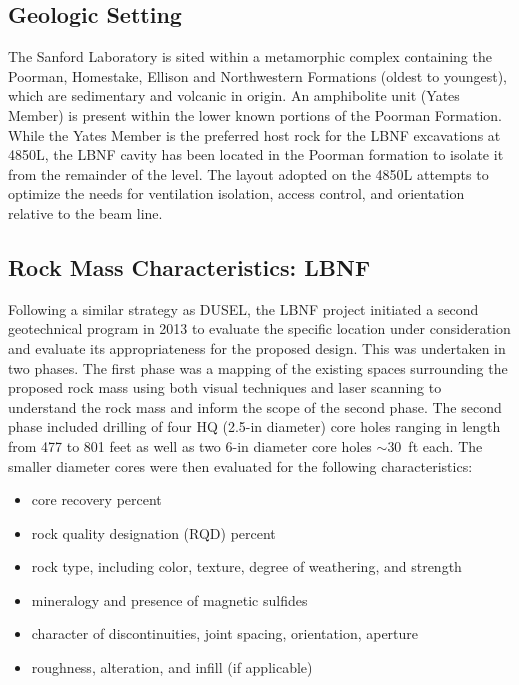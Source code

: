 \subsection{Geologic Setting}
\label{sec:fscf-site-cond-geo-set}

The Sanford Laboratory is sited within a metamorphic complex containing the Poorman, Homestake, Ellison and Northwestern Formations (oldest to youngest), which are sedimentary and volcanic in origin. An amphibolite unit (Yates Member) is present within the lower known portions of the Poorman Formation. While the Yates Member is the preferred host rock for the LBNF excavations at 4850L, the LBNF cavity has been located in the Poorman formation to isolate it from the remainder of the level. The layout adopted on the 4850L attempts to optimize the needs for ventilation isolation, access control, and orientation relative to the beam line.

\subsection{Rock Mass Characteristics: LBNF}
\label{sec:fscf-site-cond-geo-rock}

Following a similar strategy as DUSEL, the LBNF project initiated a second geotechnical program in 2013 to evaluate the specific location under consideration and evaluate its appropriateness for the proposed design.  This was undertaken in two phases.  The first phase was a mapping of the existing spaces surrounding the proposed rock mass using both visual techniques and laser scanning to understand the rock mass and inform the scope of the second phase.  The second phase included drilling of four HQ (2.5-in diameter) core holes ranging in length from 477 to 801 feet as well as two 6-in diameter core holes $\sim$30~ft each.  The smaller diameter cores were then evaluated for the following characteristics:

\begin{itemize}
 \item core recovery percent
 \item rock quality designation (RQD) percent
 \item rock type, including color, texture, degree of weathering, and strength
 \item mineralogy and presence of magnetic sulfides
 \item character of discontinuities, joint spacing, orientation, aperture
 \item roughness, alteration, and infill (if applicable)
\end{itemize}

